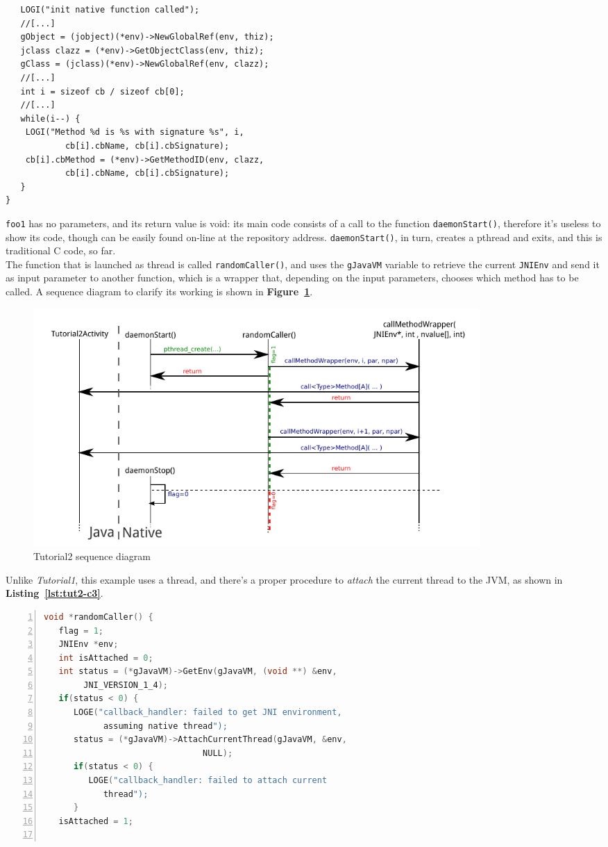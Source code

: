 \documentclass[a4paper,10pt]{article}
\newcommand{\keyword}[1]{\texttt{#1}}
\newcommand{\reff}[1]{\textbf{Figure~\ref{#1}}}
\newcommand{\refl}[1]{\textbf{Listing~\ref{#1}}}
\begin{document}
\begin{multicols}{2}
\begin{lstlisting}
   LOGI("init native function called");   
   //[...]   
   gObject = (jobject)(*env)->NewGlobalRef(env, thiz);
   jclass clazz = (*env)->GetObjectClass(env, thiz);
   gClass = (jclass)(*env)->NewGlobalRef(env, clazz);   
   //[...]   
   int i = sizeof cb / sizeof cb[0];
   //[...]   
   while(i--) {
   	LOGI("Method %d is %s with signature %s", i,
   			cb[i].cbName, cb[i].cbSignature);
   	cb[i].cbMethod = (*env)->GetMethodID(env, clazz,
   			cb[i].cbName, cb[i].cbSignature);
   }
}
\end{lstlisting}
\keyword{foo1} has no parameters, and its return value is void: its main code
consists of a call to the function \keyword{daemonStart()}, therefore it's
useless to show its code, though can be easily found on-line at the repository
address. \keyword{daemonStart()}, in turn, creates a pthread and exits, and this
is traditional C code, so far.\\
The function that is launched as thread is called \keyword{randomCaller()}, and
uses the \keyword{gJavaVM} variable to retrieve the current \keyword{JNIEnv} and
send it as input parameter to another function, which is a wrapper that,
depending on the input parameters, chooses which method has to be called. A
sequence diagram to clarify its working is shown in \reff{fig:tut12-seq}.
\begin{figure}[t]
 \includegraphics[width=17cm]{./figures/sequence.pdf}
 \caption{Tutorial2 sequence diagram}
 \label{fig:tut12-seq}
\end{figure}
Unlike \textit{Tutorial1}, this example uses a thread, and there's a proper
procedure to \textit{attach} the current thread to the JVM, as shown in
\refl{lst:tut2-c3}.
\begin{lstlisting}[language=C,
		   columns=fullflexible,
		   showstringspaces=false,
		   xleftmargin=15pt,
		   frame = l,
		   numbers=left,
		   commentstyle=\color{gray}\upshape,
		   caption=tutorial2.c - thread attachment in  randomCaller(),
		   label=lst:tut2-c3]
void *randomCaller() {
   flag = 1;
   JNIEnv *env;
   int isAttached = 0;				   
   int status = (*gJavaVM)->GetEnv(gJavaVM, (void **) &env,
		JNI_VERSION_1_4);
   if(status < 0) {
      LOGE("callback_handler: failed to get JNI environment,
      		assuming native thread");
      status = (*gJavaVM)->AttachCurrentThread(gJavaVM, &env,
      							NULL);
      if(status < 0) {
         LOGE("callback_handler: failed to attach current
         	thread");
      }
   isAttached = 1;


\end{lstlisting}
\end{multicols}
\end{document}

